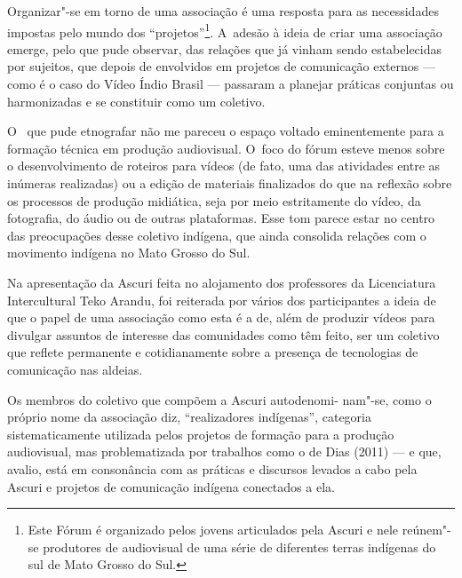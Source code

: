Organizar"-se em torno de uma associação é uma resposta para as
necessidades impostas pelo mundo dos ``projetos''\footnote[11]{Este Fórum é
organizado pelos jovens articulados pela Ascuri e nele reúnem"-se
produtores de audiovisual de uma série de diferentes terras indígenas
do sul de Mato Grosso do Sul. }. A~adesão à ideia de criar uma
associação emerge, pelo que pude observar, das relações que já vinham
sendo estabelecidas por sujeitos, que depois de envolvidos em projetos
de comunicação externos --- como é o caso do Vídeo Índio Brasil ---
passaram a planejar práticas conjuntas ou harmonizadas e se constituir
como um coletivo.

O~ que pude etnografar não me pareceu o espaço voltado eminentemente
para a formação técnica em produção audiovisual. O~foco do fórum esteve
menos sobre o desenvolvimento de roteiros para vídeos (de fato, uma das
atividades entre as inúmeras realizadas) ou a edição de materiais
finalizados do que na reflexão sobre os processos de produção
midiática, seja por meio estritamente do vídeo, da fotografia, do áudio
ou de outras plataformas. Esse tom parece estar no centro das
preocupações desse coletivo indígena, que ainda consolida relações com
o movimento indígena no Mato Grosso do Sul.

Na apresentação da Ascuri feita no alojamento dos professores da
Licenciatura Intercultural Teko Arandu, foi reiterada por vários dos
participantes a ideia de que o papel de uma associação como esta é a
de, além de produzir vídeos para divulgar assuntos de interesse das
comunidades como têm feito, ser um coletivo que reflete permanente e cotidianamente
sobre a presença de tecnologias de comunicação nas aldeias.

Os membros do coletivo que compõem a Ascuri autodenomi- nam"-se, como o
próprio nome da associação diz, ``realizadores indígenas'', categoria
sistematicamente utilizada pelos projetos de formação para a produção
audiovisual, mas problematizada por trabalhos como o de Dias (2011) --- e
que, avalio, está em consonância com as práticas e discursos levados a
cabo pela Ascuri e projetos de comunicação indígena conectados a ela.

